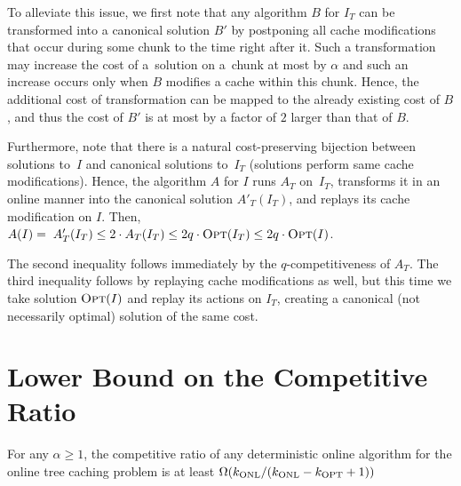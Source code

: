 \documentclass[sigconf,screen=true]{acmart}
\newcommand{\OPT}{\textsc{Opt}\xspace}
\newcommand{\kALG}{k_\textnormal{ONL}}
\newcommand{\kOPT}{k_\textnormal{OPT}}
\begin{document}
To alleviate this issue, we first note that any algorithm $B$ for $I_T$ can be
transformed into a canonical solution $B'$ by postponing all cache modifications
that occur during some chunk to the time right after it. Such a transformation
may increase the cost of a~solution on a~chunk at most by $\alpha$ and such an
increase occurs only when $B$ modifies a cache within this chunk. Hence, the
additional cost of transformation can be mapped to the already existing cost of
$B$, and thus the cost of $B'$ is at most by a factor of $2$ larger than that
of $B$.

Furthermore, note that there is a natural cost-pre\-serv\-ing bijection
between solutions to~$I$ and canonical solutions to~$I_T$ (solutions perform
same cache modifications). Hence, the algorithm $A$ for $I$ runs $A_T$
on~$I_T$, transforms it in an online manner into the canonical solution $A'_T(I_T)$, 
and replays its cache modification on $I$. Then, 
$A(I) = \; A'_T(I_T) \leq 2 \cdot A_T(I_T) 
\leq 2 q \cdot \OPT(I_T) \leq 2 q \cdot \OPT(I)$.

The second inequality follows immediately by the $q$-com\-pe\-ti\-ti\-ve\-ness
of $A_T$. The third inequality follows by replaying cache modifications as
well, but this time we take solution $\OPT(I)$ and replay its actions on $I_T$,
creating a canonical (not necessarily optimal) solution of the same cost.



\section{Lower Bound on the Competitive Ratio}
\label{sec:lower-bound-on-the-problem}

\begin{theorem}
For any $\alpha \geq 1$, the competitive ratio of any deterministic online
algorithm for the online tree caching problem is at least
$\Omega(\kALG/(\kALG-\kOPT+1))$
\end{theorem}
\end{document}
